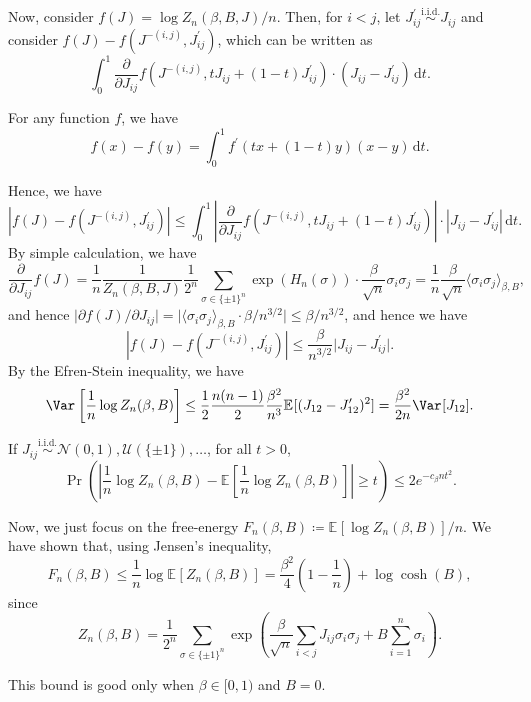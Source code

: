 Now, consider \(f(J) = \log Z_n(\beta , B, J) / n\). Then, for \(i < j\), let \(J_{ij}^{\prime} \overset{\text{i.i.d.} }{\sim } J_{ij}\) and consider \(f(J) - f(J^{-(i, j)}, J_{ij}^{\prime} )\), which can be written as
\[
	\int_{0}^{1} \frac{\partial }{\partial J_{ij}}  f(J^{-(i, j)}, tJ_{ij} + (1 - t)J_{ij}^{\prime} ) \cdot (J_{ij} - J_{ij}^{\prime} )\,\mathrm{d}t.
\]

\begin{remark}
	For any function \(f\), we have
	\[
		f(x) - f(y)
		= \int_{0}^{1} f^{\prime} (tx + (1 - t)y) (x-y) \,\mathrm{d}t.
	\]
\end{remark}

Hence, we have
\[
	\left\lvert f(J) - f(J^{-(i, j)}, J_{ij}^{\prime} ) \right\rvert
	\leq \int_{0}^{1} \left\lvert \frac{\partial }{\partial J_{ij}}  f(J^{-(i, j)}, tJ_{ij} + (1 - t)J_{ij}^{\prime} ) \right\rvert \cdot \left\lvert J_{ij} - J_{ij}^{\prime} \right\rvert \,\mathrm{d}t.
\]
By simple calculation, we have
\[
	\frac{\partial }{\partial J_{ij}} f(J)
	= \frac{1}{n} \frac{1}{Z_n(\beta , B, J)}\frac{1}{2^n} \sum_{\sigma \in \{ \pm 1 \} ^n} \exp (H_n(\sigma )) \cdot \frac{\beta }{\sqrt{n} } \sigma _i \sigma _j
	= \frac{1}{n}\frac{\beta }{\sqrt{n} } \langle \sigma _i \sigma _j \rangle _{\beta , B},
\]
and hence \(\lvert \partial f(J) / \partial J_{ij} \rvert = \lvert \langle \sigma _i \sigma _j \rangle _{\beta , B} \cdot \beta / n^{3 / 2} \rvert \leq \beta / n^{3 / 2}\), and hence we have
\[
	\left\lvert f(J) - f(J^{-(i, j)}, J_{ij}^{\prime} ) \right\rvert
	\leq \frac{\beta }{n^{3 / 2}} \lvert J_{ij} - J_{ij}^{\prime} \rvert.
\]
By the Efren-Stein inequality, we have
\[
	\Var_{}\left[\frac{1}{n} \log Z_n(\beta , B)\right]
	\leq \frac{1}{2} \frac{n(n-1)}{2} \frac{\beta ^2}{n^3} \mathbb{E}_{}[(J_{12} - J_{12}^{\prime} )^2 ]
	= \frac{\beta ^2}{2n} \Var_{}[J_{12}] .
\]

\begin{exercise}
	If \(J_{ij} \overset{\text{i.i.d.} }{\sim } \mathcal{N} (0, 1), \mathcal{U} (\{ \pm 1 \} ), \dots \), for all \(t > 0\),
	\[
		\Pr_{}\left(\left\lvert \frac{1}{n}\log Z_n(\beta , B) - \mathbb{E}_{}\left[\frac{1}{n}\log Z_n(\beta , B)\right] \right\rvert \geq t \right)
		\leq 2e^{- c_\beta n t^2}.
	\]
\end{exercise}

Now, we just focus on the free-energy \(F_n(\beta , B) \coloneqq \mathbb{E}_{}[\log Z_n(\beta , B)] / n\). We have shown that, using Jensen's inequality,
\[
	F_n(\beta , B)
	\leq \frac{1}{n} \log \mathbb{E}_{}[Z_n(\beta , B)]
	= \frac{\beta ^2}{4} \left( 1 - \frac{1}{n} \right) + \log \cosh(B),
\]
since
\[
	Z_n(\beta , B)
	= \frac{1}{2^n} \sum_{\sigma \in \{ \pm 1 \} ^n} \exp (\frac{\beta }{\sqrt{n} } \sum_{i < j} J_{ij} \sigma _i \sigma _j + B \sum_{i=1}^{n} \sigma _i).
\]
\begin{note}
	This bound is good only when \(\beta \in [0, 1)\) and \(B = 0\).
\end{note}

